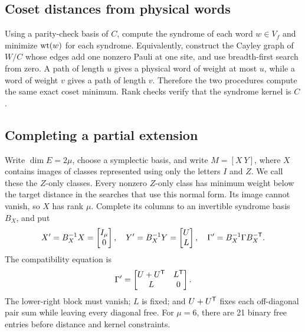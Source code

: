 \subsection{Coset distances from physical words}

Using a parity-check basis of \(C\), compute the syndrome of each word
\(w\in V_f\) and minimize \(\operatorname{wt}(w)\) for each syndrome.
Equivalently, construct the Cayley graph of \(W/C\) whose edges add
one nonzero Pauli at one site, and use breadth-first search from zero.
A path of length \(u\) gives a physical word of weight at most \(u\),
while a word of weight \(v\) gives a path of length \(v\). Therefore
the two procedures compute the same exact coset minimum. Rank checks
verify that the syndrome kernel is \(C\).

\subsection{Completing a partial extension}

Write \(\dim E=2\mu\), choose a symplectic basis, and write \(M=[X\ Y]\),
where \(X\) contains images of classes represented using only the letters
\(I\) and \(Z\). We call these the \(Z\)-only classes. Every nonzero \(Z\)-only
class has minimum weight below the target distance in the searches that use this
normal form. Its image cannot vanish, so \(X\) has rank \(\mu\).
Complete its columns to an invertible syndrome basis \(B_X\), and put
\[
 X'=B_X^{-1}X=\begin{bmatrix}I_\mu\\0\end{bmatrix},\quad
 Y'=B_X^{-1}Y=\begin{bmatrix}U\\L\end{bmatrix},\quad
 \Gamma'=B_X^{-1}\Gamma B_X^{-\mathsf T}.
\]
The compatibility equation is
\begin{equation}\label{eq:Y-normal}
 \Gamma'=\begin{bmatrix}U+U^\mathsf T&L^\mathsf T\\L&0\end{bmatrix}.
\end{equation}
The lower-right block must vanish; \(L\) is fixed; and
\(U+U^\mathsf T\) fixes each off-diagonal pair sum while leaving every
diagonal free. For \(\mu=6\), there are 21 binary free entries before
distance and kernel constraints.

